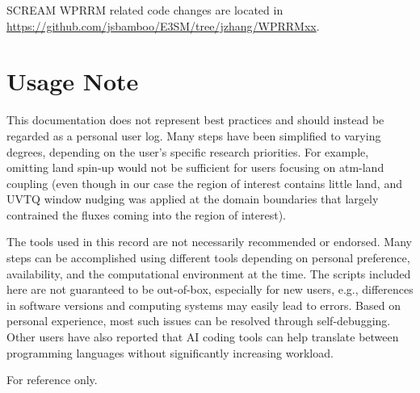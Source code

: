\documentclass[journal abbreviation, manuscript]{copernicus}
\begin{document}
SCREAM WPRRM related code changes are located in \url{https://github.com/jsbamboo/E3SM/tree/jzhang/WPRRMxx}. 


\section{Usage Note}
This documentation does not represent best practices and should instead be regarded as a personal user log. Many steps have been simplified to varying degrees, depending on the user's specific research priorities. For example, omitting land spin-up would not be sufficient for users focusing on atm-land coupling (even though in our case the region of interest contains little land, and UVTQ window nudging was applied at the domain boundaries that largely contrained the fluxes coming into the region of interest).

The tools used in this record are not necessarily recommended or endorsed. Many steps can be accomplished using different tools depending on personal preference, availability, and the computational environment at the time. The scripts included here are not guaranteed to be out-of-box, especially for new users, e.g., differences in software versions and computing systems may easily lead to errors. Based on personal experience, most such issues can be resolved through self-debugging. Other users have also reported that AI coding tools can help translate between programming languages without significantly increasing workload.

For reference only.

\newpage
\end{document}
